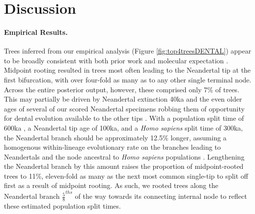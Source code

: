 \documentclass[10pt, twocolumn, twoside]{article}
\begin{document}
\clearpage

\section{Discussion}

\paragraph{Empirical Results.} Trees inferred from our empirical analysis (Figure \ref{fig:top4treesDENTAL}) appear to be broadly consistent with both prior work \citep{scottAnthropologyModernHuman2018} and molecular expectation \citep{mallickSimonsGenomeDiversity2016}. Midpoint rooting resulted in trees most often leading to the Neandertal tip at the first bifurcation, with over four-fold as many as to any other single terminal node. Across the entire posterior output, however, these comprised only 7\% of trees. This may partially be driven by Neandertal extinction 40ka \citep{highamTimingSpatiotemporalPatterning2014} and the even older ages of several of our scored Neandertal specimens robbing them of opportunity for dental evolution available to the other tips \citep[e.g. the modal specimen originates from Krapina and dates to around 130ka;][]{rinkESRAgesKrapina1995}. With a population split time of 600ka \citep{nielsenTracingPeoplingWorld2017, schlebuschSouthernAfricanAncient2017}, a Neandertal tip age of 100ka, and a \textit{Homo sapiens} split time of 300ka, the Neandertal branch should be approximately 12.5\% longer, assuming a homogenous within-lineage evolutionary rate on the branches leading to Neandertals and the node ancestral to \textit{Homo sapiens} populations \citep[though not a tree-wide strict clock;][]{gomez-roblesDentalEvolutionaryRates2019}. Lengthening the Neandertal branch by this amount raises the proportion of midpoint-rooted trees to 11\%, eleven-fold as many as the next most common single-tip to split off first as a result of midpoint rooting. As such, we rooted trees along the Neandertal branch $\frac{5}{8}^{ths}$ of the way towards its connecting internal node to reflect these estimated population split times. 
\end{document}
